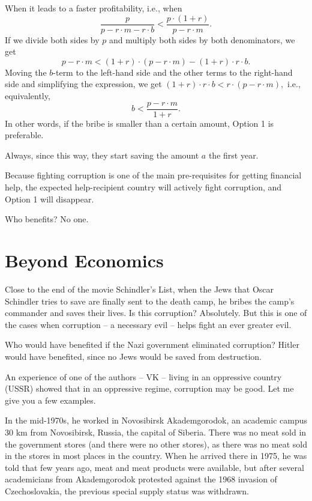 \documentclass{article}
\begin{document}
 When it leads to a faster profitability, i.e., when $$\frac{p}{p-r\cdot m-r\cdot b}<\frac{p\cdot (1+r)}{p-r\cdot m}.$$ If we divide both sides by $p$ and multiply both sides by both denominators, we get
$$p-r\cdot m<(1+r)\cdot(p-r\cdot m)-(1+r)\cdot r\cdot b.$$ Moving the $b$-term to the left-hand side and the other terms to the right-hand side and simplifying the expression, we get $(1+r)\cdot r\cdot b<r\cdot (p-r\cdot m),$ i.e., equivalently, $$b<\frac{p-r\cdot m}{1+r}.$$ In other words, if the bribe is smaller than a certain amount, Option 1 is preferable.
\medskip

 Always, since this way, they start saving the amount $a$ the first year.
\medskip

 Because fighting corruption is one of the main pre-requisites for getting financial help, the expected help-recipient country will actively fight corruption, and Option 1 will disappear.

Who benefits? No one.

\section{Beyond Economics}

Close to the end of the movie Schindler's List, when the Jews that Oscar Schindler tries to save are finally sent to the death camp, he bribes the camp's commander and saves their lives. Is this corruption? Absolutely. But this is one of the cases when corruption -- a necessary evil -- helps fight an ever greater evil.

Who would have benefited if the Nazi government eliminated corruption? Hitler would have benefited, since no Jews would be saved from destruction.
\medskip

 An experience of one of the authors -- VK -- living in an oppressive country (USSR)
showed that in an oppressive regime, corruption may be good. Let
me give you a few examples.

In the mid-1970s, he worked in Novosibirsk Akademgorodok,  an
academic campus 30 km from Novosibirsk, Russia, the capital of
Siberia.  There was no meat sold in the government stores (and
there were no other stores), as there was no meat sold in the
stores in most places in the country. When he arrived there in
1975, he was told that few years ago, meat and meat products were
available, but after several academicians from Akademgorodok
protested against the 1968 invasion of Czechoslovakia, the
previous special supply status was withdrawn.
\end{document}
